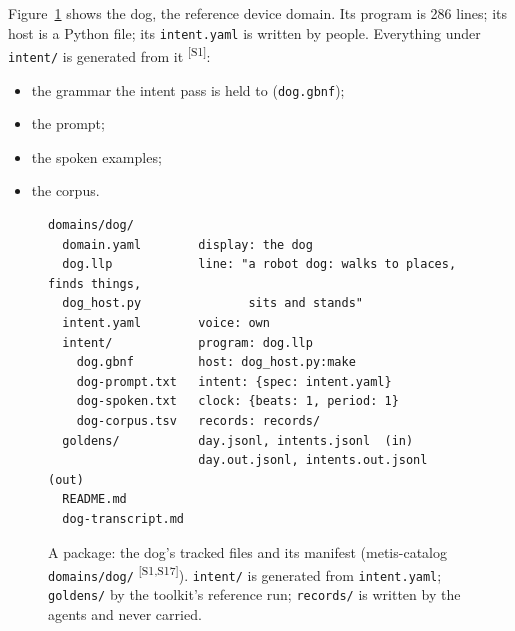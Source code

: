 \documentclass[11pt]{article}
\newcommand{\src}[1]{\textsuperscript{[#1]}}
\begin{document}
Figure~\ref{fig:dog} shows the dog, the reference device domain. Its
program is 286 lines; its host is a Python file; its \texttt{intent.yaml}
is written by people. Everything under \texttt{intent/} is generated from
it \src{S1}:
\begin{itemize}[nosep]
\item the grammar the intent pass is held to (\texttt{dog.gbnf});
\item the prompt;
\item the spoken examples;
\item the corpus.
\end{itemize}

\begin{figure}[t]
\begin{Verbatim}[fontsize=\small,frame=single]
domains/dog/
  domain.yaml        display: the dog
  dog.llp            line: "a robot dog: walks to places, finds things,
  dog_host.py               sits and stands"
  intent.yaml        voice: own
  intent/            program: dog.llp
    dog.gbnf         host: dog_host.py:make
    dog-prompt.txt   intent: {spec: intent.yaml}
    dog-spoken.txt   clock: {beats: 1, period: 1}
    dog-corpus.tsv   records: records/
  goldens/           day.jsonl, intents.jsonl  (in)
                     day.out.jsonl, intents.out.jsonl  (out)
  README.md
  dog-transcript.md
\end{Verbatim}
\caption{A package: the dog's tracked files and its manifest (metis-catalog
\texttt{domains/dog/} \src{S1,S17}). \texttt{intent/} is generated
from \texttt{intent.yaml}; \texttt{goldens/} by the toolkit's reference
run; \texttt{records/} is written by the agents and never carried.}
\label{fig:dog}
\end{figure}
\end{document}
